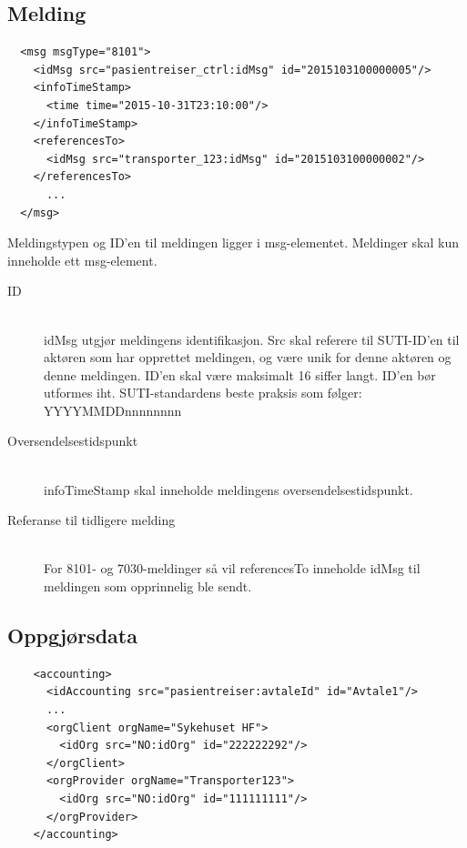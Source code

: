 \documentclass[a4paper,titlepage,norsk,11pt]{article}
\begin{document}
\subsection{Melding}

\begin{lstlisting}
  <msg msgType="8101">
    <idMsg src="pasientreiser_ctrl:idMsg" id="2015103100000005"/>
    <infoTimeStamp>
      <time time="2015-10-31T23:10:00"/>
    </infoTimeStamp>
    <referencesTo>
      <idMsg src="transporter_123:idMsg" id="2015103100000002"/>
    </referencesTo>
      ...
  </msg>
\end{lstlisting}

Meldingstypen og ID'en til meldingen ligger i msg-elementet. Meldinger skal kun inneholde ett msg-element.

\begin{description}

	\item[ID] \hfill \\
	idMsg utgjør meldingens identifikasjon. Src skal referere til SUTI-ID'en til aktøren som har opprettet meldingen, og være unik for denne aktøren og denne meldingen. ID'en skal være maksimalt 16 siffer langt. ID'en bør utformes iht. SUTI-standardens beste praksis som følger: YYYYMMDDnnnnnnnn

	\item[Oversendelsestidspunkt] \hfill \\
	infoTimeStamp skal inneholde meldingens oversendelsestidspunkt.

	\item[Referanse til tidligere melding] \hfill \\
	For 8101- og 7030-meldinger så vil referencesTo inneholde idMsg til meldingen som opprinnelig ble sendt.

\end{description}

\subsection{Oppgjørsdata}

\begin{lstlisting}
    <accounting>
      <idAccounting src="pasientreiser:avtaleId" id="Avtale1"/>
      ...
      <orgClient orgName="Sykehuset HF">
        <idOrg src="NO:idOrg" id="222222292"/>
      </orgClient>
      <orgProvider orgName="Transporter123">
        <idOrg src="NO:idOrg" id="111111111"/>
      </orgProvider>
    </accounting>
\end{lstlisting}
\end{document}
